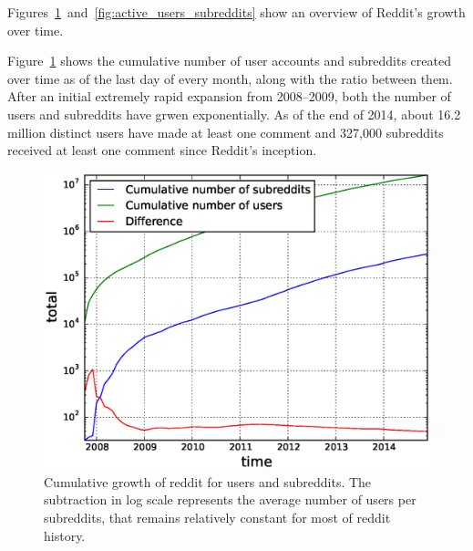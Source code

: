 Figures~\ref{fig:cumulative_users_subreddits}~and~\ref{fig:active_users_subreddits} show an overview of Reddit's growth over time.  

Figure~\ref{fig:cumulative_users_subreddits} shows the cumulative number of user accounts and subreddits created over time as of the last day of every month, along with the ratio between them.  After an initial extremely rapid expansion from 2008--2009, both the number of users and subreddits have grwen exponentially.  As of the end of 2014, about 16.2 million distinct users have made at least one comment and 327,000 subreddits received at least one comment since Reddit's inception.


\begin{figure}[!tb]
\centering
\includegraphics[scale=0.4]{./images/cumulative_users_subreddits.eps}
\caption{Cumulative growth of reddit for users and subreddits. The subtraction in log scale represents the average number of users per subreddits, that remains relatively constant for most of reddit history.}
\label{fig:cumulative_users_subreddits}
\end{figure}


